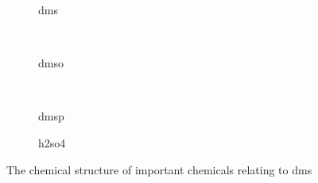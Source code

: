 	\begin{figure}
	    \centering
	    \begin{subfigure}[t]{0.4\textwidth}
	        \centering
	        \caption{\gls{dms}}
	        \label{fig:dms}
	    \end{subfigure}
	    ~ %
	    \begin{subfigure}[t]{0.4\textwidth}
	        \centering
	        \caption{\gls{dmso}}
	        \label{fig:dmso}
	    \end{subfigure}
	    ~ %
	    \begin{subfigure}[t]{0.4\textwidth}
	        \centering
	        \caption{\gls{dmsp}}
	        \label{fig:dmsp}
	    \end{subfigure}
	    \begin{subfigure}[t]{0.4\textwidth}
	        \centering
	        \caption{\gls{h2so4}}
	        \label{fig:h2so4}
	    \end{subfigure}
	    \caption{The chemical structure of important chemicals relating to \gls{dms} }\label{fig:chem}
	\end{figure}




